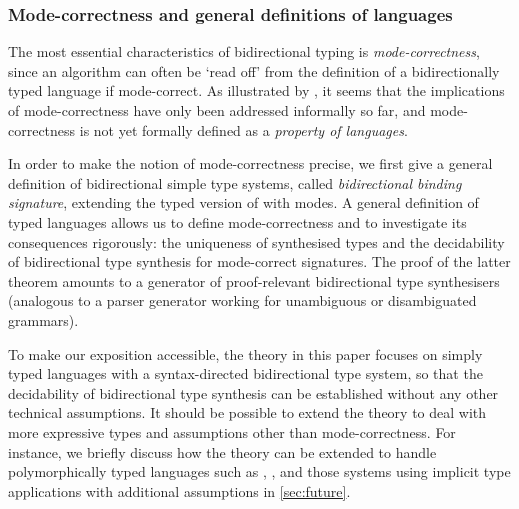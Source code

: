 

\subsubsection{Mode-correctness and general definitions of languages}
\label{sec:language-formalisation}
The most essential characteristics of bidirectional typing is \emph{mode-correctness}, since an algorithm can often be `read off' from the definition of a bidirectionally typed language if mode-correct.
As illustrated by \citet{Dunfield2021}, it seems that the implications of mode-correctness have only been addressed informally so far, and mode-correctness is not yet formally defined as a \emph{property of languages}.

In order to make the notion of mode-correctness precise, we first give a general definition of bidirectional simple type systems, called \emph{bidirectional binding signature}, extending the typed version of  with modes.
A general definition of typed languages allows us to define mode-correctness and to investigate its consequences rigorously: the uniqueness of synthesised types and the decidability of bidirectional type synthesis for mode-correct signatures.
The proof of the latter theorem amounts to a generator of proof-relevant bidirectional type synthesisers (analogous to a parser generator working for unambiguous or disambiguated grammars).

To make our exposition accessible, the theory in this paper focuses on simply typed languages with a syntax-directed bidirectional type system, so that the decidability of bidirectional type synthesis can be established without any other technical assumptions.
It should be possible to extend the theory to deal with more expressive types and assumptions other than mode-correctness.
For instance, we briefly discuss how the theory can be extended to handle polymorphically typed languages such as \SystemF, \SystemFsub, and those systems using implicit type applications with additional assumptions in \cref{sec:future}.

